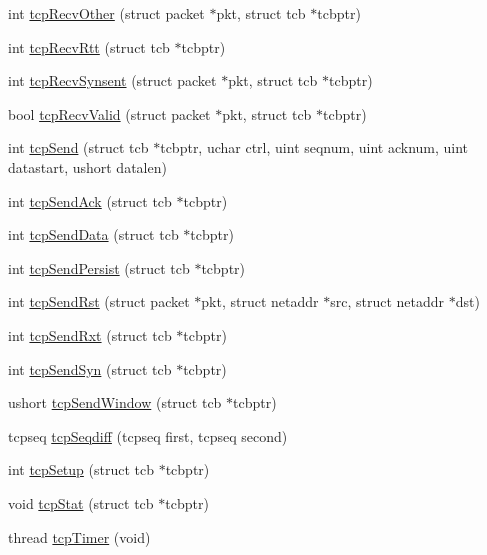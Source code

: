 \begin{DoxyCompactItemize}
int \hyperlink{group__tcp_ga1710673f803d8de161b1f3361c4bdfe3}{tcp\-Recv\-Other} (struct packet $\ast$pkt, struct tcb $\ast$tcbptr)
\item 
int \hyperlink{group__tcp_ga677c08cb2df41f2401c5d290a9c75aed}{tcp\-Recv\-Rtt} (struct tcb $\ast$tcbptr)
\item 
int \hyperlink{group__tcp_gad0ae4a69a0245140ecc469e4da3e0b3e}{tcp\-Recv\-Synsent} (struct packet $\ast$pkt, struct tcb $\ast$tcbptr)
\item 
bool \hyperlink{group__tcp_ga7a97dea541478f672cf14d3605b4d61a}{tcp\-Recv\-Valid} (struct packet $\ast$pkt, struct tcb $\ast$tcbptr)
\item 
int \hyperlink{group__tcp_ga9043f3398e6fc376b80bd6815089d429}{tcp\-Send} (struct tcb $\ast$tcbptr, uchar ctrl, uint seqnum, uint acknum, uint datastart, ushort datalen)
\item 
int \hyperlink{group__tcp_ga96aabab6af46b8ca509a343ace40560d}{tcp\-Send\-Ack} (struct tcb $\ast$tcbptr)
\item 
int \hyperlink{group__tcp_gafd1b604ee757b32ba9e8ba43c5b36016}{tcp\-Send\-Data} (struct tcb $\ast$tcbptr)
\item 
int \hyperlink{group__tcp_gaccbfb1de34110858fffedcfd8c25d173}{tcp\-Send\-Persist} (struct tcb $\ast$tcbptr)
\item 
int \hyperlink{group__tcp_gaba6d7a6b0712369c16b4638856448a0d}{tcp\-Send\-Rst} (struct packet $\ast$pkt, struct netaddr $\ast$src, struct netaddr $\ast$dst)
\item 
int \hyperlink{group__tcp_ga6624cffbf72611b38c851038c69c081a}{tcp\-Send\-Rxt} (struct tcb $\ast$tcbptr)
\item 
int \hyperlink{group__tcp_ga11d70dce9f7e24b008e67c1441280516}{tcp\-Send\-Syn} (struct tcb $\ast$tcbptr)
\item 
ushort \hyperlink{group__tcp_ga9c6b058b062936d898e8271d17c9be3b}{tcp\-Send\-Window} (struct tcb $\ast$tcbptr)
\item 
tcpseq \hyperlink{group__tcp_ga68b91348e1b9aee77e4864bf8cff4865}{tcp\-Seqdiff} (tcpseq first, tcpseq second)
\item 
int \hyperlink{group__tcp_ga2eb00046ecdf585e473444ac8f43c4ff}{tcp\-Setup} (struct tcb $\ast$tcbptr)
\item 
void \hyperlink{group__tcp_ga98980048cd0cb43f86026683f5dca029}{tcp\-Stat} (struct tcb $\ast$tcbptr)
\item 
thread \hyperlink{group__tcp_ga85c103c53fb875865effc96125c85b0f}{tcp\-Timer} (void)
\item 

\end{DoxyCompactItemize}
